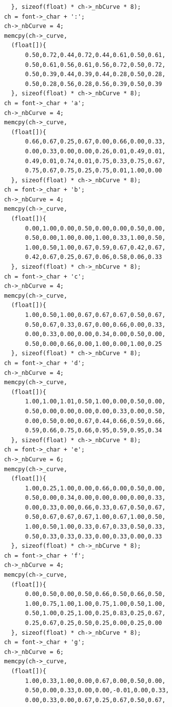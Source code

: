 \documentclass[12pt, a4paper]{article}
\begin{document}
\begin{scriptsize}
\begin{ttfamily}
\begin{lstlisting}
    }, sizeof(float) * ch->_nbCurve * 8);
  ch = font->_char + ':';
  ch->_nbCurve = 4;
  memcpy(ch->_curve, 
    (float[]){
        0.50,0.72,0.44,0.72,0.44,0.61,0.50,0.61,
        0.50,0.61,0.56,0.61,0.56,0.72,0.50,0.72,
        0.50,0.39,0.44,0.39,0.44,0.28,0.50,0.28,
        0.50,0.28,0.56,0.28,0.56,0.39,0.50,0.39
    }, sizeof(float) * ch->_nbCurve * 8);
  ch = font->_char + 'a';
  ch->_nbCurve = 4;
  memcpy(ch->_curve, 
    (float[]){
        0.66,0.67,0.25,0.67,0.00,0.66,0.00,0.33,
        0.00,0.33,0.00,0.00,0.26,0.01,0.49,0.01,
        0.49,0.01,0.74,0.01,0.75,0.33,0.75,0.67,
        0.75,0.67,0.75,0.25,0.75,0.01,1.00,0.00
    }, sizeof(float) * ch->_nbCurve * 8);
  ch = font->_char + 'b';
  ch->_nbCurve = 4;
  memcpy(ch->_curve, 
    (float[]){
        0.00,1.00,0.00,0.50,0.00,0.00,0.50,0.00,
        0.50,0.00,1.00,0.00,1.00,0.33,1.00,0.50,
        1.00,0.50,1.00,0.67,0.59,0.67,0.42,0.67,
        0.42,0.67,0.25,0.67,0.06,0.58,0.06,0.33
    }, sizeof(float) * ch->_nbCurve * 8);
  ch = font->_char + 'c';
  ch->_nbCurve = 4;
  memcpy(ch->_curve, 
    (float[]){
        1.00,0.50,1.00,0.67,0.67,0.67,0.50,0.67,
        0.50,0.67,0.33,0.67,0.00,0.66,0.00,0.33,
        0.00,0.33,0.00,0.00,0.34,0.00,0.50,0.00,
        0.50,0.00,0.66,0.00,1.00,0.00,1.00,0.25
    }, sizeof(float) * ch->_nbCurve * 8);
  ch = font->_char + 'd';
  ch->_nbCurve = 4;
  memcpy(ch->_curve, 
    (float[]){
        1.00,1.00,1.01,0.50,1.00,0.00,0.50,0.00,
        0.50,0.00,0.00,0.00,0.00,0.33,0.00,0.50,
        0.00,0.50,0.00,0.67,0.44,0.66,0.59,0.66,
        0.59,0.66,0.75,0.66,0.95,0.59,0.95,0.34
    }, sizeof(float) * ch->_nbCurve * 8);
  ch = font->_char + 'e';
  ch->_nbCurve = 6;
  memcpy(ch->_curve, 
    (float[]){
        1.00,0.25,1.00,0.00,0.66,0.00,0.50,0.00,
        0.50,0.00,0.34,0.00,0.00,0.00,0.00,0.33,
        0.00,0.33,0.00,0.66,0.33,0.67,0.50,0.67,
        0.50,0.67,0.67,0.67,1.00,0.67,1.00,0.50,
        1.00,0.50,1.00,0.33,0.67,0.33,0.50,0.33,
        0.50,0.33,0.33,0.33,0.00,0.33,0.00,0.33
    }, sizeof(float) * ch->_nbCurve * 8);
  ch = font->_char + 'f';
  ch->_nbCurve = 4;
  memcpy(ch->_curve, 
    (float[]){
        0.00,0.50,0.00,0.50,0.66,0.50,0.66,0.50,
        1.00,0.75,1.00,1.00,0.75,1.00,0.50,1.00,
        0.50,1.00,0.25,1.00,0.25,0.83,0.25,0.67,
        0.25,0.67,0.25,0.50,0.25,0.00,0.25,0.00
    }, sizeof(float) * ch->_nbCurve * 8);
  ch = font->_char + 'g';
  ch->_nbCurve = 6;
  memcpy(ch->_curve, 
    (float[]){
        1.00,0.33,1.00,0.00,0.67,0.00,0.50,0.00,
        0.50,0.00,0.33,0.00,0.00,-0.01,0.00,0.33,
        0.00,0.33,0.00,0.67,0.25,0.67,0.50,0.67,

\end{lstlisting}
\end{ttfamily}
\end{scriptsize}
\end{document}
